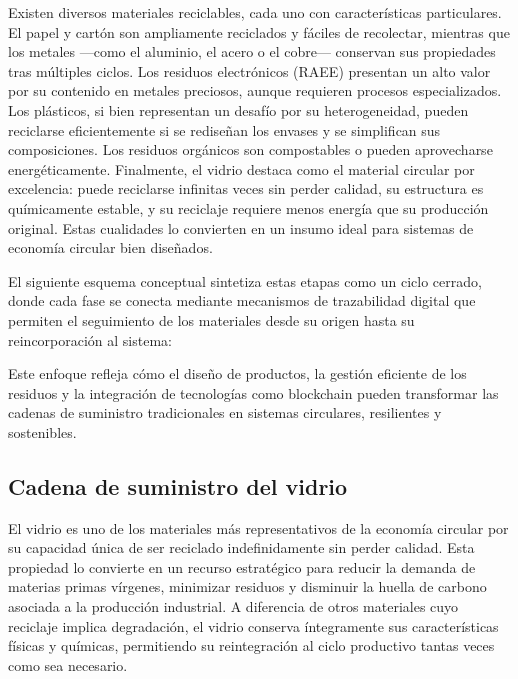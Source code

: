 Existen diversos materiales reciclables, cada uno con características particulares. El papel y cartón son ampliamente reciclados y fáciles de recolectar, mientras que los metales —como el aluminio, el acero o el cobre— conservan sus propiedades tras múltiples ciclos. Los residuos electrónicos (RAEE) presentan un alto valor por su contenido en metales preciosos, aunque requieren procesos especializados. Los plásticos, si bien representan un desafío por su heterogeneidad, pueden reciclarse eficientemente si se rediseñan los envases y se simplifican sus composiciones. Los residuos orgánicos son compostables o pueden aprovecharse energéticamente. Finalmente, el vidrio destaca como el material circular por excelencia: puede reciclarse infinitas veces sin perder calidad, su estructura es químicamente estable, y su reciclaje requiere menos energía que su producción original. Estas cualidades lo convierten en un insumo ideal para sistemas de economía circular bien diseñados.

El siguiente esquema conceptual sintetiza estas etapas como un ciclo cerrado, donde cada fase se conecta mediante mecanismos de trazabilidad digital que permiten el seguimiento de los materiales desde su origen hasta su reincorporación al sistema:


Este enfoque refleja cómo el diseño de productos, la gestión eficiente de los residuos y la integración de tecnologías como blockchain pueden transformar las cadenas de suministro tradicionales en sistemas circulares, resilientes y sostenibles.

\subsection{Cadena de suministro del vidrio}

El vidrio es uno de los materiales más representativos de la economía circular por su capacidad única de ser reciclado indefinidamente sin perder calidad. Esta propiedad lo convierte en un recurso estratégico para reducir la demanda de materias primas vírgenes, minimizar residuos y disminuir la huella de carbono asociada a la producción industrial. A diferencia de otros materiales cuyo reciclaje implica degradación, el vidrio conserva íntegramente sus características físicas y químicas, permitiendo su reintegración al ciclo productivo tantas veces como sea necesario.

